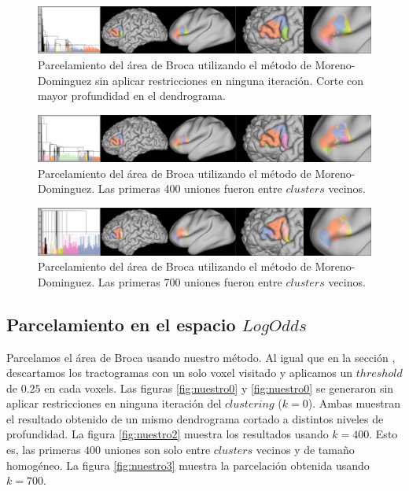 \begin{figure}[h!]
    \includegraphics[width=\textwidth]{img/broca/moreno_0_deep.png}
    \caption{Parcelamiento del \'area de Broca utilizando el m\'etodo de 
             Moreno-Dominguez sin aplicar restricciones en ninguna
             iteraci\'on. Corte con mayor profundidad en el dendrograma.}
    \label{fig:moreno1}
\end{figure}

\begin{figure}[h!]
    \includegraphics[width=\textwidth]{img/broca/moreno_400.png}
    \caption{Parcelamiento del \'area de Broca utilizando el m\'etodo de 
             Moreno-Dominguez. Las primeras 400 uniones fueron entre
             $clusters$ vecinos.}
    \label{fig:moreno2}
\end{figure}

\begin{figure}[h!]
    \includegraphics[width=\textwidth]{img/broca/moreno_750.png}
    \caption{Parcelamiento del \'area de Broca utilizando el m\'etodo de 
             Moreno-Dominguez. Las primeras 700 uniones fueron entre
             $clusters$ vecinos.}
    \label{fig:moreno3}
\end{figure}


\subsection{Parcelamiento en el espacio $LogOdds$}
\label{sec:nuestro_broca}

Parcelamos el \'area de Broca usando nuestro m\'etodo. Al igual que en la 
secci\'on \label{ch:nuestro}, descartamos los tractogramas con un solo
voxel visitado y aplicamos un $threshold$ de $0.25$ en cada voxels. 
Las figuras \ref{fig:nuestro0} y \ref{fig:nuestro0} se generaron sin 
aplicar restricciones en ninguna iteraci\'on del $clustering$ ($k=0$).
Ambas muestran el resultado obtenido de un mismo dendrograma cortado a 
distintos niveles de profundidad. La figura \ref{fig:nuestro2} muestra los
resultados usando $k=400$. Esto es, las primeras $400$ uniones son
solo entre $clusters$ vecinos y de tama\~no homog\'eneo. La figura
\ref{fig:nuestro3} muestra la parcelaci\'on obtenida usando $k=700$.\\

